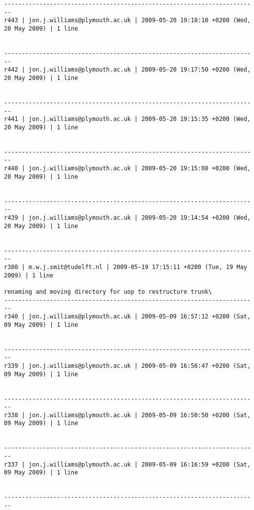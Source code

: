 \documentclass[9]{report}
\begin{document}
\begin{description}
\begin{verbatim}
------------------------------------------------------------------------
r443 | jon.j.williams@plymouth.ac.uk | 2009-05-20 19:18:10 +0200 (Wed, 20 May 2009) | 1 line


------------------------------------------------------------------------
r442 | jon.j.williams@plymouth.ac.uk | 2009-05-20 19:17:50 +0200 (Wed, 20 May 2009) | 1 line


------------------------------------------------------------------------
r441 | jon.j.williams@plymouth.ac.uk | 2009-05-20 19:15:35 +0200 (Wed, 20 May 2009) | 1 line


------------------------------------------------------------------------
r440 | jon.j.williams@plymouth.ac.uk | 2009-05-20 19:15:08 +0200 (Wed, 20 May 2009) | 1 line


------------------------------------------------------------------------
r439 | jon.j.williams@plymouth.ac.uk | 2009-05-20 19:14:54 +0200 (Wed, 20 May 2009) | 1 line


------------------------------------------------------------------------
r380 | m.w.j.smit@tudelft.nl | 2009-05-19 17:15:11 +0200 (Tue, 19 May 2009) | 1 line

renaming and moving directory for uop to restructure trunk\
------------------------------------------------------------------------
r340 | jon.j.williams@plymouth.ac.uk | 2009-05-09 16:57:12 +0200 (Sat, 09 May 2009) | 1 line


------------------------------------------------------------------------
r339 | jon.j.williams@plymouth.ac.uk | 2009-05-09 16:56:47 +0200 (Sat, 09 May 2009) | 1 line


------------------------------------------------------------------------
r338 | jon.j.williams@plymouth.ac.uk | 2009-05-09 16:50:50 +0200 (Sat, 09 May 2009) | 1 line


------------------------------------------------------------------------
r337 | jon.j.williams@plymouth.ac.uk | 2009-05-09 16:16:59 +0200 (Sat, 09 May 2009) | 1 line


------------------------------------------------------------------------


\end{verbatim}
\end{description}
\end{document}
